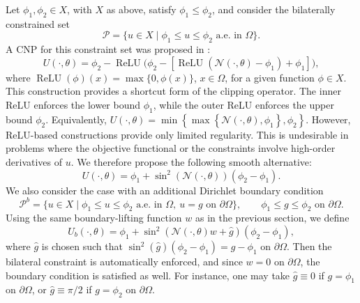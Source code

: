 \documentclass{article}
\numberwithin{equation}{section}
\begin{document}
Let $\phi_1,\phi_2\in X$, with $X$ as above, satisfy $\phi_1\le \phi_2$, and consider the bilaterally constrained set
\begin{equation}
    \mathcal{P}
    =
    \{u\in X\mid \phi_1\le u\le \phi_2 \text{ a.e. in } \Omega\}.
\end{equation}
A CNP for this constraint set was proposed in \cite{song2026single}:
\begin{equation}
    U(\cdot,\theta)
    =
    \phi_2-\operatorname{ReLU}\bigl(\phi_2-[\operatorname{ReLU}(\mathcal{N}(\cdot,\theta)-\phi_1)+\phi_1]\bigr),
\end{equation}
where $\operatorname{ReLU}(\phi)(x)=\max\{0,\phi(x)\}$, $x\in\Omega$, for a given function $\phi\in X$. This construction provides a shortcut form of the clipping operator. 
The inner ReLU enforces the lower bound \(\phi_1\), while the outer ReLU enforces the upper bound \(\phi_2\). Equivalently, $
U(\cdot,\theta)
=
\min\left\{
\max\left\{\mathcal{N}(\cdot,\theta),\phi_1\right\},
\phi_2
\right\}$. However, ReLU-based constructions provide only limited regularity. This is undesirable in problems where the objective functional or the constraints involve high-order derivatives of $u$. We therefore propose the following smooth alternative:
\begin{equation}\label{mh.bilateral}
    U(\cdot,\theta)
    =
    \phi_1+\sin^2(\mathcal{N}(\cdot,\theta))(\phi_2-\phi_1).
\end{equation}
We also consider the case with an additional Dirichlet boundary condition
\begin{equation}
    \mathcal{P}^b
    =
    \{u\in X\mid \phi_1\le u\le \phi_2 \text{ a.e. in } \Omega,\ u=g \text{ on }\partial\Omega\},
    \qquad
    \phi_1\le g\le \phi_2 \text{ on } \partial\Omega.
\end{equation}
Using the same boundary-lifting function $w$ as in the previous section, we define
\begin{equation}
    U_b(\cdot,\theta)
    =
    \phi_1+\sin^2(\mathcal{N}(\cdot,\theta)w+\hat g)(\phi_2-\phi_1),
\end{equation}
where $\hat g$ is chosen such that
    $\sin^2(\hat g)(\phi_2-\phi_1)=g-\phi_1
    \text{ on } \partial\Omega$.
Then the bilateral constraint is automatically enforced, and since $w=0$ on $\partial\Omega$, the boundary condition is satisfied as well. For instance, one may take $\hat g\equiv 0$ if $g=\phi_1$ on $\partial\Omega$, or $\hat g\equiv \pi/2$ if $g=\phi_2$ on $\partial\Omega$.
\end{document}
